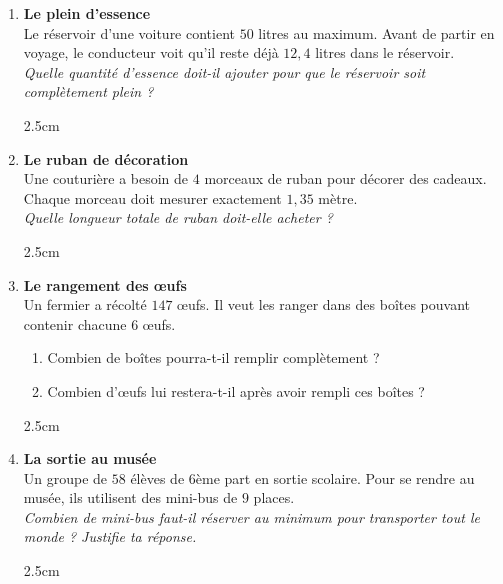 \documentclass[a4paper]{book}
\begin{document}
{\begin{exercice}
\begin{enumerate}
            \item \textbf{Le plein d'essence} \\
            Le réservoir d'une voiture contient $50$ litres au maximum. Avant de partir en voyage, le conducteur voit qu'il reste déjà $12,4$ litres dans le réservoir. \\
            \textit{Quelle quantité d'essence doit-il ajouter pour que le réservoir soit complètement plein ?}

            \begin{ZoneReponse}{2.5cm}
            \end{ZoneReponse}
        
            \item \textbf{Le ruban de décoration} \\
            Une couturière a besoin de $4$ morceaux de ruban pour décorer des cadeaux. Chaque morceau doit mesurer exactement $1,35$ mètre. \\
            \textit{Quelle longueur totale de ruban doit-elle acheter ?}

            \begin{ZoneReponse}{2.5cm}
            \end{ZoneReponse}
        
            \item \textbf{Le rangement des œufs} \\
            Un fermier a récolté $147$ œufs. Il veut les ranger dans des boîtes pouvant contenir chacune $6$ œufs. 
            \begin{enumerate}
                \item Combien de boîtes pourra-t-il remplir complètement ? 
                \item Combien d'œufs lui restera-t-il après avoir rempli ces boîtes ?
            \end{enumerate}
        
            \begin{ZoneReponse}{2.5cm}
            \end{ZoneReponse}
        
            \item \textbf{La sortie au musée} \\
            Un groupe de $58$ élèves de 6ème part en sortie scolaire. Pour se rendre au musée, ils utilisent des mini-bus de $9$ places. \\
            \textit{Combien de mini-bus faut-il réserver au minimum pour transporter tout le monde ? Justifie ta réponse.}

            \begin{ZoneReponse}{2.5cm}
            \end{ZoneReponse}
        
        \end{enumerate}
    \end{exercice}
}
\end{document}
